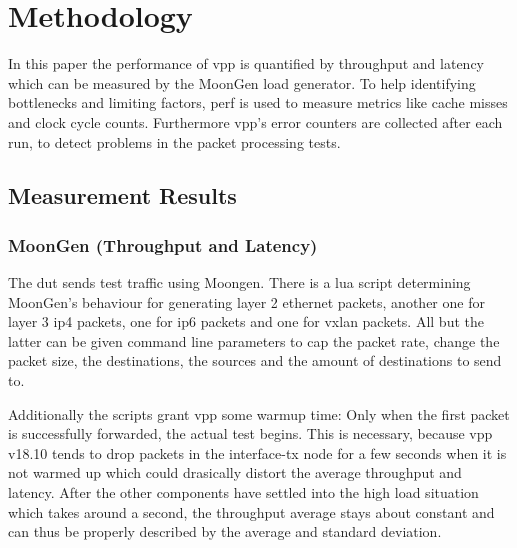 
\section{Methodology}
\label{sec:methodology}






In this paper the performance of \Ac{vpp} is quantified by throughput
and latency which can be measured by the MoonGen
\cite{emmerich2015moongen} load generator. To help identifying
bottlenecks and limiting factors, \Ac{perf} is used to measure metrics
like cache misses and clock cycle counts. Furthermore \Ac{vpp}'s error
counters are collected after each run, to detect problems in the
packet processing tests.


\subsection{Measurement Results}



\subsubsection{MoonGen (Throughput and Latency)} 


The \Ac{dut} sends test traffic using Moongen. There is a lua script
determining MoonGen's behaviour for generating layer 2 ethernet
packets, another one for layer 3 \Ac{ip4} packets, one for \Ac{ip6}
packets and one for \Ac{vxlan} packets. All but the latter can be
given command line parameters to cap the packet rate, change the
packet size, the destinations, the sources and the amount of
destinations to send to.

Additionally the scripts grant \Ac{vpp} some warmup time: Only when
the first packet is successfully forwarded, the actual test begins.
This is necessary, because \Ac{vpp} v18.10 tends to drop packets in
the interface-tx node for a few seconds when it is not warmed up which
could drasically distort the average throughput and latency. After the
other components have settled into the high load situation which takes
around a second, the throughput average stays about constant and can
thus be properly described by the average and standard deviation.

